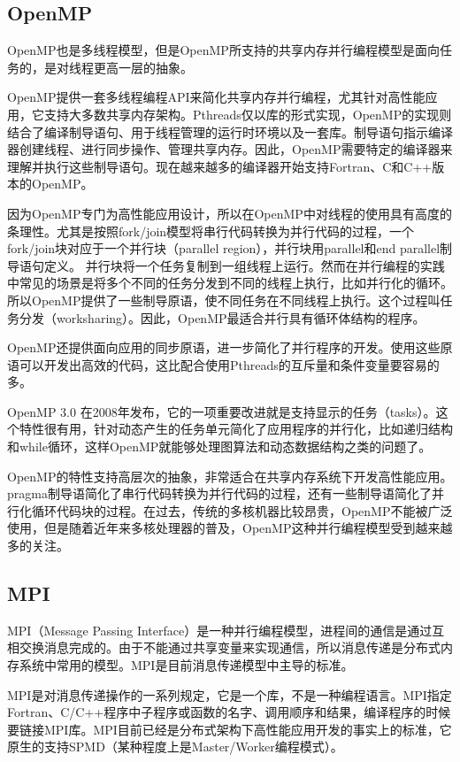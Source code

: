 \subsection{OpenMP}

OpenMP\citep{OpenMP}也是多线程模型，但是OpenMP所支持的共享内存并行编程模型是面向任务的，是对线程更高一层的抽象。

OpenMP提供一套多线程编程API来简化共享内存并行编程，尤其针对高性能应用，它支持大多数共享内存架构。Pthreads仅以库的形式实现，OpenMP的实现则结合了编译制导语句、用于线程管理的运行时环境以及一套库。制导语句指示编译器创建线程、进行同步操作、管理共享内存。因此，OpenMP需要特定的编译器来理解并执行这些制导语句。现在越来越多的编译器开始支持Fortran、C和C++版本的OpenMP。

因为OpenMP专门为高性能应用设计，所以在OpenMP中对线程的使用具有高度的条理性。尤其是按照fork/join模型将串行代码转换为并行代码的过程，一个fork/join块对应于一个并行块（parallel region），并行块用parallel和end parallel制导语句定义。 并行块将一个任务复制到一组线程上运行。然而在并行编程的实践中常见的场景是将多个不同的任务分发到不同的线程上执行，比如并行化的循环。所以OpenMP提供了一些制导原语，使不同任务在不同线程上执行。这个过程叫任务分发（worksharing）。因此，OpenMP最适合并行具有循环体结构的程序\citep{mattson2004patterns}。

OpenMP还提供面向应用的同步原语，进一步简化了并行程序的开发。使用这些原语可以开发出高效的代码，这比配合使用Pthreads的互斥量和条件变量要容易的多。

OpenMP 3.0 在2008年发布\citep{openmp2008spec3}，它的一项重要改进就是支持显示的任务（tasks）。这个特性很有用，针对动态产生的任务单元简化了应用程序的并行化，比如递归结构和while循环，这样OpenMP就能够处理图算法和动态数据结构之类的问题了。

OpenMP的特性支持高层次的抽象，非常适合在共享内存系统下开发高性能应用。pragma制导语简化了串行代码转换为并行代码的过程，还有一些制导语简化了并行化循环代码块的过程。在过去，传统的多核机器比较昂贵，OpenMP不能被广泛使用，但是随着近年来多核处理器的普及，OpenMP这种并行编程模型受到越来越多的关注。

\subsection{MPI}

MPI（Message Passing Interface）是一种并行编程模型，进程间的通信是通过互相交换消息完成的。由于不能通过共享变量来实现通信，所以消息传递是分布式内存系统中常用的模型。MPI是目前消息传递模型中主导的标准。
  
MPI\citep{pacheco1997parallel}是对消息传递操作的一系列规定，它是一个库，不是一种编程语言。MPI指定Fortran、C/C++程序中子程序或函数的名字、调用顺序和结果，编译程序的时候要链接MPI库。MPI目前已经是分布式架构下高性能应用开发的事实上的标准，它原生的支持SPMD\citep{mattson2004patterns}（某种程度上是Master/Worker编程模式）。  

